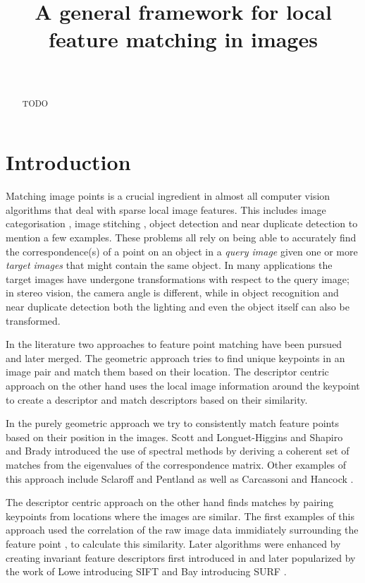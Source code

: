 \documentclass[journal]{IEEEtran}
\title{A general framework for local feature matching in images}
\author{%
\IEEEauthorblockN{%
Jonas Toft Arnfred,\IEEEauthorrefmark{1} Stefan 
Winkler,\IEEEauthorrefmark{1} Sabine S\"usstrunk\IEEEauthorrefmark{2}}\\
\vspace{1mm}
\IEEEauthorblockA{%
\IEEEauthorrefmark{1}~Advanced Digital Sciences Center (ADSC), University of Illinois at Urbana-Champaign (UIUC), Singapore\\
\IEEEauthorrefmark{2}~\'Ecole Polytechnique F\'ed\'erale de Lausanne (EPFL), Switzerland}
}
\begin{document}
\maketitle
%
\begin{abstract}
TODO
\end{abstract}
%
\section{Introduction}
%
Matching image points is a crucial ingredient in almost all computer 
vision algorithms that deal with sparse local image features. This 
includes image categorisation \cite{bosch2008scene}, image stitching 
\cite{brown2007automatic}, object detection \cite{zhang2007local} and 
near duplicate detection \cite{zhao2009scale} to mention a few examples.  
These problems all rely on being able to accurately find the 
correspondence(s) of a point on an object in a \emph{query image} given 
one or more \emph{target images} that might contain the same object.  In 
many applications the target images have undergone transformations with 
respect to the query image; in stereo vision, the camera angle is 
different, while in object recognition and near duplicate detection both 
the lighting and even the object itself can also be transformed.

In the literature two approaches to feature point matching have been 
pursued and later merged. The geometric approach tries to find unique 
keypoints in an image pair and match them based on their location.  The 
descriptor centric approach on the other hand uses the local image 
information around the keypoint to create a descriptor and match 
descriptors based on their similarity.

In the purely geometric approach we try to consistently match feature 
points based on their position in the images. Scott and Longuet-Higgins 
\cite{scott1991algorithm} and Shapiro and Brady 
\cite{shapiro1992feature} introduced the use of spectral methods by 
deriving a coherent set of matches from the eigenvalues of the 
correspondence matrix. Other examples of this approach include Sclaroff 
and Pentland \cite{sclaroff1995modal} as well as Carcassoni and Hancock 
\cite{carcassoni2003spectral}.

The descriptor centric approach on the other hand finds matches by 
pairing keypoints from locations where the images are similar. The first 
examples of this approach used the correlation of the raw image data 
immidiately surrounding the feature point \cite{deriche1994robust}, 
\cite{baumberg2000reliable} to calculate this similarity. Later 
algorithms were enhanced by creating invariant feature descriptors first 
introduced in \cite{schmid1997local} and later popularized by the work 
of Lowe introducing SIFT \cite{lowe2004sift} and Bay introducing SURF 
\cite{bay2006surf}.
\end{document}
